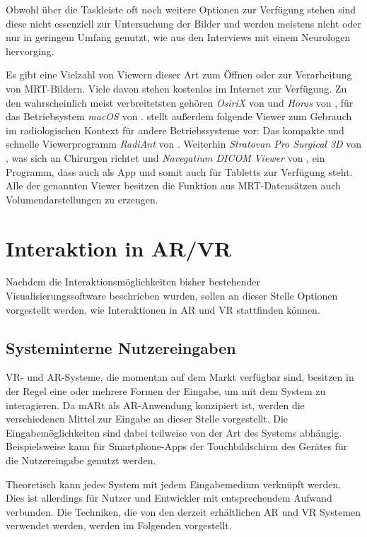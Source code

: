 Obwohl über die Taskleiste oft noch weitere Optionen zur Verfügung stehen sind diese nicht essenziell zur Untersuchung der Bilder und werden meistens nicht oder nur in geringem Umfang genutzt, wie aus den Interviews mit einem Neurologen hervorging.

Es gibt eine Vielzahl von Viewern dieser Art zum Öffnen oder zur Verarbeitung von MRT-Bildern. Viele davon stehen kostenlos im Internet zur Verfügung. 
Zu den wahrscheinlich meist verbreitetsten gehören \textit{OsiriX} von \cite{osirix} und \textit{Horos} von \cite{horos}, für das Betriebsystem \textit{macOS} von \cite{macOs}. \cite{radiocafe} stellt außerdem folgende Viewer zum Gebrauch im radiologischen Kontext für andere Betriebssysteme vor: Das kompakte und schnelle Viewerprogramm \textit{RadiAnt} von \cite{radiant}. Weiterhin \textit{Stratovan Pro Surgical 3D} von \cite{prosurgical}, was sich an Chirurgen richtet und \textit{Navegatium DICOM Viewer} von \cite{navegatium}, ein Programm, dass auch als App und somit auch für Tabletts zur Verfügung steht.
Alle der genannten Viewer besitzen die Funktion aus MRT-Datensätzen auch Volumendarstellungen zu erzeugen.

\section{Interaktion in AR/VR}	
\label{VRInteraktion}							 %

Nachdem die Interaktionsmöglichkeiten bisher bestehender Visualisierungssoftware beschrieben wurden, sollen an dieser Stelle Optionen vorgestellt werden, wie Interaktionen in AR und VR stattfinden können. 

\subsection{Systeminterne Nutzereingaben}

VR- und AR-Systeme, die momentan auf dem Markt verfügbar sind, besitzen in der Regel  eine oder mehrere Formen der Eingabe, um mit dem System zu interagieren. Da mARt als AR-Anwendung konzipiert ist, werden die verschiedenen Mittel zur Eingabe an dieser Stelle vorgestellt.
Die Eingabemöglichkeiten sind dabei teilweise von der Art des Systems abhängig. 
Beispielsweise kann für Smartphone-Apps der Touchbildschirm des Gerätes für die Nutzereingabe genutzt werden. 

Theoretisch kann jedes System mit jedem Eingabemedium verknüpft werden. Dies ist allerdings für Nutzer und Entwickler mit entsprechendem Aufwand verbunden. Die Techniken, die von den derzeit erhältlichen AR und VR Systemen verwendet werden, werden im Folgenden vorgestellt.


